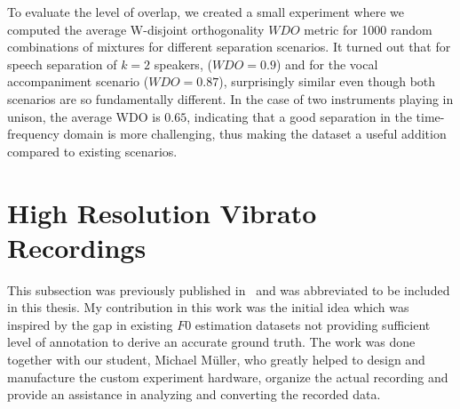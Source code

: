 To evaluate the level of overlap, we created a small experiment where we computed the average W-disjoint orthogonality \(WDO\) metric for 1000 random combinations of mixtures for different separation scenarios.
It turned out that for speech separation of \(k=2\) speakers, (\(WDO=0.9\)) and for the vocal accompaniment scenario (\(WDO=0.87\)), surprisingly similar even though both scenarios are so fundamentally different.
In the case of two instruments playing in unison, the average WDO is \(0.65\), indicating that a good separation in the time-frequency domain is more challenging, thus making the dataset a useful addition compared to existing scenarios.


\section{High Resolution Vibrato Recordings}%
\label{sec:muserc}

\begin{shaded}
  This subsection was previously published in~\cite{stoeter15acm} and was abbreviated to be included in this thesis.
  My contribution in this work was the initial idea which was inspired by the gap in existing $F0$ estimation datasets not providing sufficient level of annotation to derive an accurate ground truth.
  The work was done together with our student, Michael Müller, who greatly helped to design and manufacture the custom experiment hardware, organize the actual recording and provide an assistance in analyzing and converting the recorded data.
\end{shaded}

